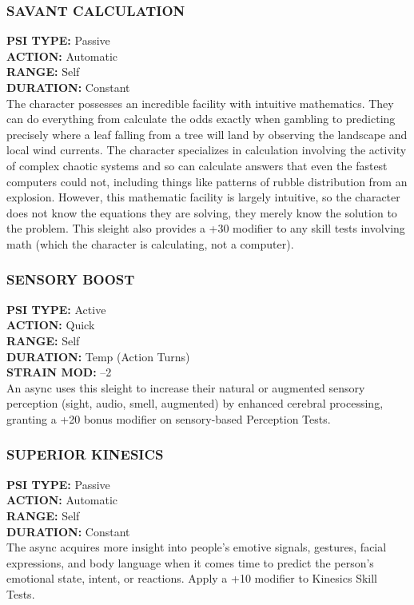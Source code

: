 \subsubsection{SAVANT CALCULATION}
\textbf{PSI TYPE:} Passive \\ 
\textbf{ACTION:} Automatic \\ 
\textbf{RANGE:} Self \\ 
\textbf{DURATION:} Constant \\
The character possesses an incredible facility with
intuitive mathematics. They can do everything from
calculate the odds exactly when gambling to predicting
precisely where a leaf falling from a tree will land
by observing the landscape and local wind currents.
The character specializes in calculation involving the
activity of complex chaotic systems and so can calculate
answers that even the fastest computers could not,
including things like patterns of rubble distribution
from an explosion. However, this mathematic facility
is largely intuitive, so the character does not know the
equations they are solving, they merely know the solution
to the problem.
This sleight also provides a +30 modifier to any
skill tests involving math (which the character is calculating,
not a computer).

\subsubsection{SENSORY BOOST}
\textbf{PSI TYPE:} Active \\ 
\textbf{ACTION:} Quick \\ 
\textbf{RANGE:} Self \\ 
\textbf{DURATION:} Temp (Action Turns) \\
\textbf{STRAIN MOD:} –2 \\
An async uses this sleight to increase their natural or
augmented sensory perception (sight, audio, smell,
augmented) by enhanced cerebral processing, granting
a +20 bonus modifier on sensory-based Perception
Tests.

\subsubsection{SUPERIOR KINESICS}
\textbf{PSI TYPE:} Passive \\ 
\textbf{ACTION:} Automatic \\ 
\textbf{RANGE:} Self \\ 
\textbf{DURATION:} Constant \\
The async acquires more insight into people’s emotive
signals, gestures, facial expressions, and body
language when it comes time to predict the person’s
emotional state, intent, or reactions. Apply a +10
modifier to Kinesics Skill Tests.

